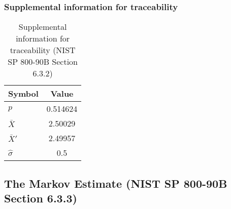 \documentclass[a3paper,xelatex,english]{bxjsarticle}
\begin{document}
\subsubsection{Supplemental information for traceability}
\renewcommand{\arraystretch}{1.8}
\begin{table}[h]
\caption{Supplemental information for traceability (NIST SP 800-90B Section 6.3.2)}
\begin{center}
\begin{tabular}{|l|c|}
\hline 
\rowcolor{anotherlightblue} %
Symbol				& Value \\ \hline 
$p$				& 0.514624\\ \hline 
$\bar{X}$ 		&  2.50029\\ \hline
$\bar{X}'$		&  2.49957\\ \hline
$\hat{\sigma}$		&      0.5\\ \hline
\end{tabular}
\end{center}
\end{table}
\renewcommand{\arraystretch}{1.4}
\clearpage
\subsection{The Markov Estimate (NIST SP 800-90B Section 6.3.3)}\label{sec:Binary633}
\end{document}
